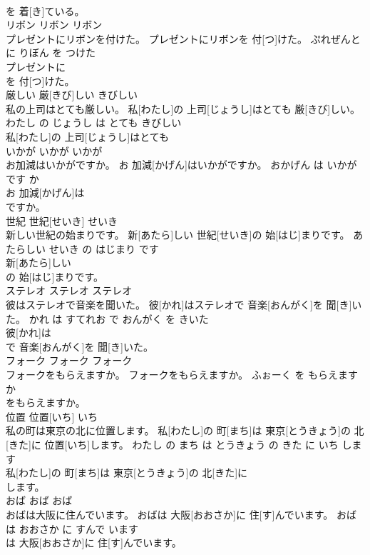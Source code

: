 \documentclass[8pt]{extreport}
\begin{document}
\begin{CJK}{UTF8}{min}
\\	を 着[き]ている。			
\\	リボン	リボン	リボン	
\\	プレゼントにリボンを付けた。	プレゼントにリボンを 付[つ]けた。	ぷれぜんと に りぼん を つけた	
\\	プレゼントに
\\	を 付[つ]けた。			
\\	厳しい	厳[きび]しい	きびしい	
\\	私の上司はとても厳しい。	私[わたし]の 上司[じょうし]はとても 厳[きび]しい。	わたし の じょうし は とても きびしい	
\\	私[わたし]の 上司[じょうし]はとても
\\	いかが	いかが	いかが	
\\	お加減はいかがですか。	お 加減[かげん]はいかがですか。	おかげん は いかが です か	
\\	お 加減[かげん]は
\\	ですか。			
\\	世紀	世紀[せいき]	せいき	
\\	新しい世紀の始まりです。	新[あたら]しい 世紀[せいき]の 始[はじ]まりです。	あたらしい せいき の はじまり です	
\\	新[あたら]しい
\\	の 始[はじ]まりです。			
\\	ステレオ	ステレオ	ステレオ	
\\	彼はステレオで音楽を聞いた。	彼[かれ]はステレオで 音楽[おんがく]を 聞[き]いた。	かれ は すてれお で おんがく を きいた	
\\	彼[かれ]は
\\	で 音楽[おんがく]を 聞[き]いた。			
\\	フォーク	フォーク	フォーク	
\\	フォークをもらえますか。	フォークをもらえますか。	ふぉーく を もらえます か	
\\	をもらえますか。			
\\	位置	位置[いち]	いち	
\\	私の町は東京の北に位置します。	私[わたし]の 町[まち]は 東京[とうきょう]の 北[きた]に 位置[いち]します。	わたし の まち は とうきょう の きた に いち します	
\\	私[わたし]の 町[まち]は 東京[とうきょう]の 北[きた]に
\\	します。			
\\	おば	おば	おば	
\\	おばは大阪に住んでいます。	おばは 大阪[おおさか]に 住[す]んでいます。	おば は おおさか に すんで います	
\\	は 大阪[おおさか]に 住[す]んでいます。			

\end{CJK}
\end{document}
